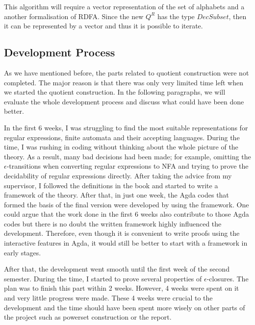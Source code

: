 \par This algorithm will require a vector representation of the set of
alphabets and a another formalisation of RDFA. Since the new \(Q^R\) has
the type \(DecSubset\), then it can be represented by a vector and
thus it is possible to iterate. 


\subsection{Development Process}
\par As we have mentioned before, the parts related to quotient
construction were not completed. The major reason is
that there was only very limited time left when we started the quotient
construction. In the following paragraphs, we will evaluate the whole
development process and discuss what could have been done better. 

\par In the first 6 weeks, I was struggling to find
the most suitable representations for regular expressions, finite
automata and their accepting languages. During the time, I was
rushing in coding without thinking about the whole picture of
the theory. As a result, many bad decisions had been made; for example, omitting the
\(\epsilon\)-transitions when converting regular expressions to NFA and trying to prove
the decidability of regular expressions directly. After taking the
advice from my supervisor, I followed the definitions in the
book \cite{aho1972} and started to write a framework of the
theory. After that, in just one week, the Agda
codes that formed the basis of the final version were developed by
using the framework. One could argue that the work
done in the first 6 weeks also contribute to those Agda codes but
there is no doubt the written framework highly influenced the
development. Therefore, even though it is convenient to write proofs
using the interactive features in Agda,
it would still be better to start with a framework in early stages. 

\par After that, the development went smooth until the first week of
the second semester. During the time, I started to prove several
properties of \(\epsilon\)-closures. The plan was to finish this part
within 2 weeks. However, 4 weeks were spent on it and very little
progress were made. These 4 weeks were crucial to the development and
the time should have been spent more wisely on other parts of the
project such as powerset construction or the report. 


